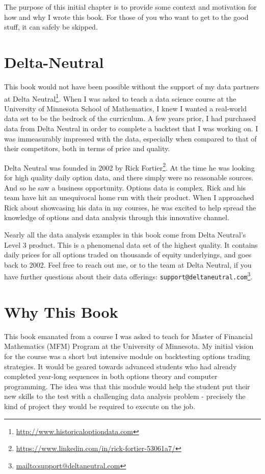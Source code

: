 \documentclass[11pt,]{krantz}
\renewcommand{\href}[2]{#2\footnote{\url{#1}}}
\begin{document}
The purpose of this initial chapter is to provide some context and motivation for how and why I wrote this book. For those of you who want to get to the good stuff, it can safely be skipped.

\section{Delta-Neutral}\label{delta-neutral}

This book would not have been possible without the support of my data partners at \href{http://www.historicaloptiondata.com}{Delta Neutral}. When I was asked to teach a data science course at the University of Minnesota School of Mathematics, I knew I wanted a real-world data set to be the bedrock of the curriculum. A few years prior, I had purchased data from Delta Neutral in order to complete a backtest that I was working on. I was immeasurably impressed with the data, especially when compared to that of their competitors, both in terms of price and quality.

Delta Neutral was founded in 2002 by \href{https://www.linkedin.com/in/rick-fortier-53061a7/}{Rick Fortier}. At the time he was looking for high quality daily option data, and there simply were no reasonable sources. And so he saw a business opportunity. Options data is complex. Rick and his team have hit an unequivocal home run with their product. When I approached Rick about showcasing his data in my courses, he was excited to help spread the knowledge of options and data analysis through this innovative channel.

Nearly all the data analysis examples in this book come from Delta Neutral's Level 3 product. This is a phenomenal data set of the highest quality. It contains daily prices for all options traded on thousands of equity underlyings, and goes back to 2002. Feel free to reach out me, or to the team at Delta Neutral, if you have further questions about their data offerings: \href{mailto:support@deltaneutral.com}{\nolinkurl{support@deltaneutral.com}}.

\section{Why This Book}\label{why-this-book}

This book emanated from a course I was asked to teach for Master of Financial Mathematics (MFM) Program at the University of Minnesota. My initial vision for the course was a short but intensive module on backtesting options trading strategies. It would be geared towards advanced students who had already completed year-long sequences in both options theory and computer programming. The idea was that this module would help the student put their new skills to the test with a challenging data analysis problem - precisely the kind of project they would be required to execute on the job.
\end{document}
